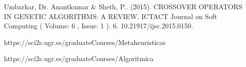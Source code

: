 
\newpage
\begin{thebibliography}{0}
		
		 Umbarkar, Dr. Anantkumar \& Sheth, P.. (2015). CROSSOVER OPERATORS IN GENETIC ALGORITHMS: A REVIEW. ICTACT Journal on Soft Computing ( Volume: 6 , Issue: 1 ). 6. 10.21917/ijsc.2015.0150. 
		
		 https://sci2s.ugr.es/graduateCourses/Metaheuristicas
		
		https://sci2s.ugr.es/graduateCourses/Algoritmica
		
		
		
	\end{thebibliography}
